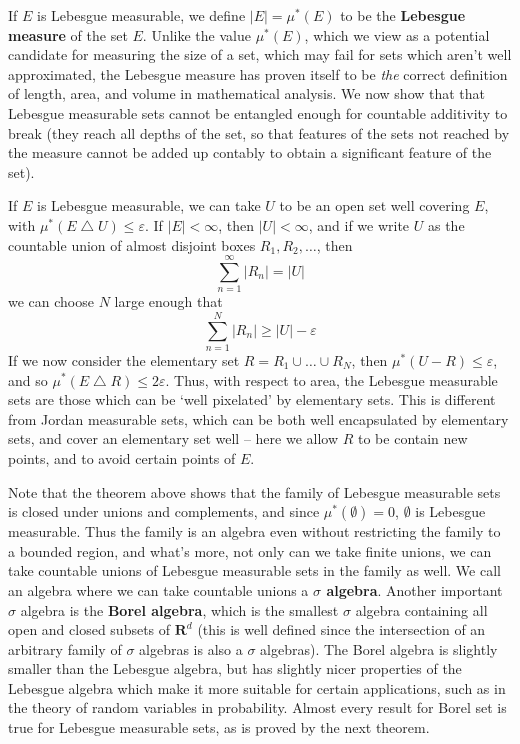 If $E$ is Lebesgue measurable, we define $|E| = \mu^*(E)$ to be the {\bf Lebesgue measure} of the set $E$. Unlike the value $\mu^*(E)$, which we view as a potential candidate for measuring the size of a set, which may fail for sets which aren't well approximated, the Lebesgue measure has proven itself to be {\it the} correct definition of length, area, and volume in mathematical analysis. We now show that that Lebesgue measurable sets cannot be entangled enough for countable additivity to break (they reach all depths of the set, so that features of the sets not reached by the measure cannot be added up contably to obtain a significant feature of the set).

\begin{remark}
  If $E$ is Lebesgue measurable, we can take $U$ to be an open set well covering $E$, with $\mu^*(E \bigtriangleup U) \leq \varepsilon$. If $|E| < \infty$, then $|U| < \infty$, and if we write $U$ as the countable union of almost disjoint boxes $R_1, R_2, \dots$, then
  \[ \sum_{n = 1}^\infty |R_n| = |U| \]
  we can choose $N$ large enough that
  \[ \sum_{n = 1}^N |R_n| \geq |U| - \varepsilon \]
  If we now consider the elementary set $R = R_1 \cup \dots \cup R_N$, then $\mu^*(U - R) \leq \varepsilon$, and so $\mu^*(E \bigtriangleup R) \leq 2\varepsilon$. Thus, with respect to area, the Lebesgue measurable sets are those which can be `well pixelated' by elementary sets. This is different from Jordan measurable sets, which can be both well encapsulated by elementary sets, and cover an elementary set well -- here we allow $R$ to be contain new points, and to avoid certain points of $E$.
\end{remark}

Note that the theorem above shows that the family of Lebesgue measurable sets is closed under unions and complements, and since $\mu^*(\emptyset) = 0$, $\emptyset$ is Lebesgue measurable. Thus the family is an algebra even without restricting the family to a bounded region, and what's more, not only can we take finite unions, we can take countable unions of Lebesgue measurable sets in the family as well. We call an algebra where we can take countable unions a {\bf $\sigma$ algebra}. Another important $\sigma$ algebra is the {\bf Borel algebra}, which is the smallest $\sigma$ algebra containing all open and closed subsets of $\mathbf{R}^d$ (this is well defined since the intersection of an arbitrary family of $\sigma$ algebras is also a $\sigma$ algebras). The Borel algebra is slightly smaller than the Lebesgue algebra, but has slightly nicer properties of the Lebesgue algebra which make it more suitable for certain applications, such as in the theory of random variables in probability. Almost every result for Borel set is true for Lebesgue measurable sets, as is proved by the next theorem.

